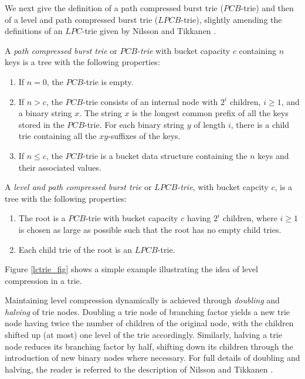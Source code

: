 \documentclass[]{acmtrans2m}
\begin{document}
We next give the definition of a path compressed burst trie ($PCB$-trie) and then of a level and path 
compressed burst trie ($LPCB$-trie), slightly amending the definitions of an $LPC$-trie given
by Nilsson and Tikkanen \citeyear{NilssonTikkanen02}.

\begin{definition}
A \textit{path compressed burst trie} or \textit{$PCB$-trie} with bucket capacity $c$ containing $n$ keys is a tree 
with the following properties:
\begin{enumerate}
    \item If $n = 0$, the $PCB$-trie is empty.
    \item If $n > c$, the $PCB$-trie consists of an internal node with $2^i$ children, $i \geq 1$,
          and a binary string $x$. The string $x$ is the longest common prefix  
          of all the keys stored in the $PCB$-trie. For each binary string $y$ of length $i$, 
          there is a child trie containing all the $xy$-suffixes of the keys.
    \item If $n \leq c$, the $PCB$-trie is a bucket data structure containing the $n$ keys and their associated values.
\end{enumerate}
\end{definition}

\begin{definition}
A \textit{level and path compressed burst trie} or \textit{$LPCB$-trie}, with bucket capcity $c$, is a tree with the following properties: 
\begin{enumerate}
    \item The root is a $PCB$-trie with bucket capacity $c$ having $2^i$ children, where $i \geq 1$ is chosen as large as possible such
          that the root has no empty child tries.
    \item Each child trie of the root is an $LPCB$-trie.
\end{enumerate}
\end{definition}

\noindent
Figure \ref{lctrie_fig} shows a simple example illustrating the idea of level compression in a trie.

Maintaining level compression dynamically is achieved through \textit{doubling} and \textit{halving} of trie nodes.
Doubling a trie node of branching factor yields a new trie node having twice the number of children
of the original node, with the children shifted up (at most) one level of the trie accordingly. Similarly, halving a trie node reduces
its branching factor by half, shifting down its children through the introduction of new binary nodes where necessary. For full
details of doubling and halving, the reader is referred to the description of Nilsson and Tikkanen \citeyear{NilssonTikkanen02}.
\end{document}
